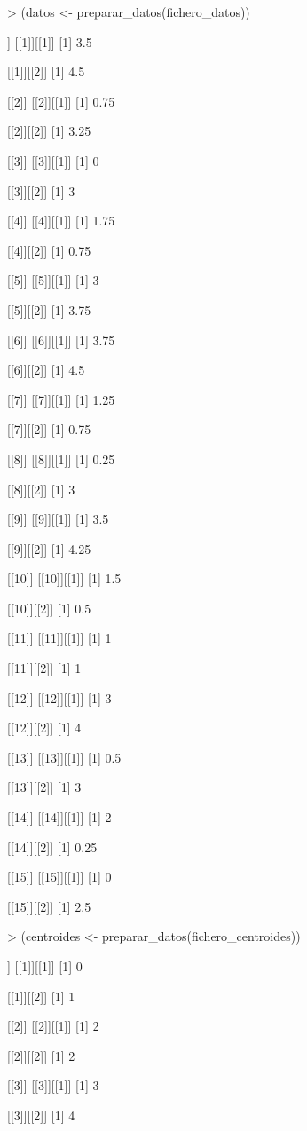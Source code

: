 \documentclass[parskip=full]{scrartcl}
\begin{document}
\begin{Schunk}
\begin{Sinput}
> (datos <- preparar_datos(fichero_datos))
\end{Sinput}
\begin{Soutput}
[[1]]
[[1]][[1]]
[1] 3.5

[[1]][[2]]
[1] 4.5


[[2]]
[[2]][[1]]
[1] 0.75

[[2]][[2]]
[1] 3.25


[[3]]
[[3]][[1]]
[1] 0

[[3]][[2]]
[1] 3


[[4]]
[[4]][[1]]
[1] 1.75

[[4]][[2]]
[1] 0.75


[[5]]
[[5]][[1]]
[1] 3

[[5]][[2]]
[1] 3.75


[[6]]
[[6]][[1]]
[1] 3.75

[[6]][[2]]
[1] 4.5


[[7]]
[[7]][[1]]
[1] 1.25

[[7]][[2]]
[1] 0.75


[[8]]
[[8]][[1]]
[1] 0.25

[[8]][[2]]
[1] 3


[[9]]
[[9]][[1]]
[1] 3.5

[[9]][[2]]
[1] 4.25


[[10]]
[[10]][[1]]
[1] 1.5

[[10]][[2]]
[1] 0.5


[[11]]
[[11]][[1]]
[1] 1

[[11]][[2]]
[1] 1


[[12]]
[[12]][[1]]
[1] 3

[[12]][[2]]
[1] 4


[[13]]
[[13]][[1]]
[1] 0.5

[[13]][[2]]
[1] 3


[[14]]
[[14]][[1]]
[1] 2

[[14]][[2]]
[1] 0.25


[[15]]
[[15]][[1]]
[1] 0

[[15]][[2]]
[1] 2.5
\end{Soutput}
\begin{Sinput}
> (centroides <- preparar_datos(fichero_centroides))
\end{Sinput}
\begin{Soutput}
[[1]]
[[1]][[1]]
[1] 0

[[1]][[2]]
[1] 1


[[2]]
[[2]][[1]]
[1] 2

[[2]][[2]]
[1] 2


[[3]]
[[3]][[1]]
[1] 3

[[3]][[2]]
[1] 4
\end{Soutput}
\end{Schunk}
\end{document}
